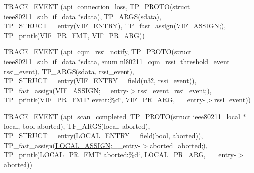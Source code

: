 \begin{DoxyCompactItemize}
\item 
\hyperlink{driver-trace_8h_a06d325afd22ef8e91117d952351e410a}{T\-R\-A\-C\-E\-\_\-\-E\-V\-E\-N\-T} (api\-\_\-connection\-\_\-loss, T\-P\-\_\-\-P\-R\-O\-T\-O(struct \hyperlink{structieee80211__sub__if__data}{ieee80211\-\_\-sub\-\_\-if\-\_\-data} $\ast$sdata), T\-P\-\_\-\-A\-R\-G\-S(sdata), T\-P\-\_\-\-S\-T\-R\-U\-C\-T\-\_\-\-\_\-entry(\hyperlink{driver-trace_8h_af9528f0b6f59f04b6c6ab283b1b65d9d}{V\-I\-F\-\_\-\-E\-N\-T\-R\-Y}), T\-P\-\_\-fast\-\_\-assign(\hyperlink{driver-trace_8h_af5ede80f04ffcb3f644f68837b1d252c}{V\-I\-F\-\_\-\-A\-S\-S\-I\-G\-N};), T\-P\-\_\-printk(\hyperlink{driver-trace_8h_a50711161ccfc99a73b43b988149a61a5}{V\-I\-F\-\_\-\-P\-R\-\_\-\-F\-M\-T}, \hyperlink{driver-trace_8h_a12c9f3afcd1c461f7ae2f86fd8503977}{V\-I\-F\-\_\-\-P\-R\-\_\-\-A\-R\-G}))
\item 
\hyperlink{driver-trace_8h_a6e5431e7f099ab22fd431c64db9dfa29}{T\-R\-A\-C\-E\-\_\-\-E\-V\-E\-N\-T} (api\-\_\-cqm\-\_\-rssi\-\_\-notify, T\-P\-\_\-\-P\-R\-O\-T\-O(struct \hyperlink{structieee80211__sub__if__data}{ieee80211\-\_\-sub\-\_\-if\-\_\-data} $\ast$sdata, enum nl80211\-\_\-cqm\-\_\-rssi\-\_\-threshold\-\_\-event rssi\-\_\-event), T\-P\-\_\-\-A\-R\-G\-S(sdata, rssi\-\_\-event), T\-P\-\_\-\-S\-T\-R\-U\-C\-T\-\_\-\-\_\-entry(V\-I\-F\-\_\-\-E\-N\-T\-R\-Y\-\_\-\-\_\-field(u32, rssi\-\_\-event)), T\-P\-\_\-fast\-\_\-assign(\hyperlink{driver-trace_8h_af5ede80f04ffcb3f644f68837b1d252c}{V\-I\-F\-\_\-\-A\-S\-S\-I\-G\-N};\-\_\-\-\_\-entry-\/$>$rssi\-\_\-event=rssi\-\_\-event;), T\-P\-\_\-printk(\hyperlink{driver-trace_8h_a50711161ccfc99a73b43b988149a61a5}{V\-I\-F\-\_\-\-P\-R\-\_\-\-F\-M\-T}\char`\"{} event\-:\%d\char`\"{}, V\-I\-F\-\_\-\-P\-R\-\_\-\-A\-R\-G, \-\_\-\-\_\-entry-\/$>$rssi\-\_\-event))
\item 
\hyperlink{driver-trace_8h_ae33fdca968b0ead0256960e64028d421}{T\-R\-A\-C\-E\-\_\-\-E\-V\-E\-N\-T} (api\-\_\-scan\-\_\-completed, T\-P\-\_\-\-P\-R\-O\-T\-O(struct \hyperlink{structieee80211__local}{ieee80211\-\_\-local} $\ast$local, bool aborted), T\-P\-\_\-\-A\-R\-G\-S(local, aborted), T\-P\-\_\-\-S\-T\-R\-U\-C\-T\-\_\-\-\_\-entry(L\-O\-C\-A\-L\-\_\-\-E\-N\-T\-R\-Y\-\_\-\-\_\-field(bool, aborted)), T\-P\-\_\-fast\-\_\-assign(\hyperlink{driver-trace_8h_ab19d9141887ea92ef9640df06a51e0a1}{L\-O\-C\-A\-L\-\_\-\-A\-S\-S\-I\-G\-N};\-\_\-\-\_\-entry-\/$>$aborted=aborted;), T\-P\-\_\-printk(\hyperlink{driver-trace_8h_a09833af423135e21ffe99a59ae088cf1}{L\-O\-C\-A\-L\-\_\-\-P\-R\-\_\-\-F\-M\-T}\char`\"{} aborted\-:\%d\char`\"{}, L\-O\-C\-A\-L\-\_\-\-P\-R\-\_\-\-A\-R\-G, \-\_\-\-\_\-entry-\/$>$aborted))

\end{DoxyCompactItemize}
